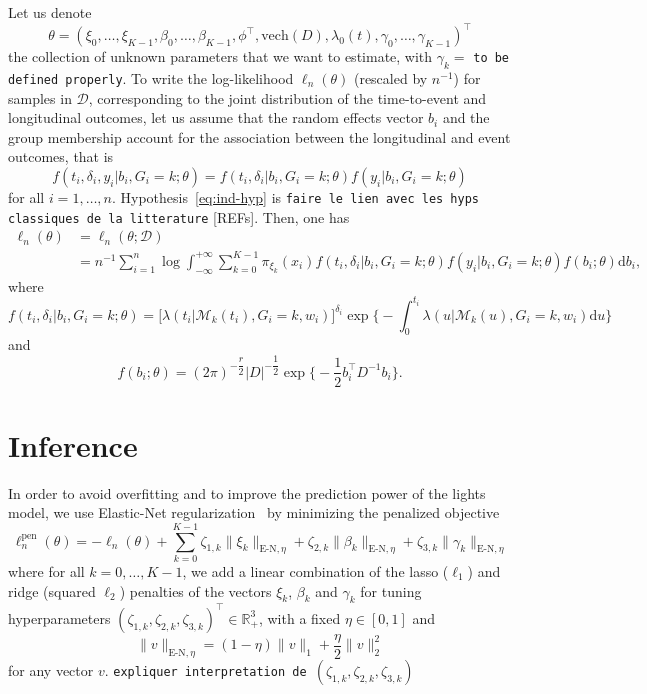 \documentclass[11pt]{article}
\newcommand{\dd}{\mathrm{d}}
\newcommand{\norm}[1]{\|#1\|}
\newcommand{\cM}{\mathcal M}
\newcommand{\cD}{\mathcal D}
\newcommand{\R}{\mathds R}
\begin{document}
Let us denote 
\[ \theta = (\xi_0, \ldots, \xi_{K-1}, \beta_0, \ldots, \beta_{K-1}, \phi^\top, \text{vech}(D), \lambda_0(t), \gamma_0, \ldots, \gamma_{K-1})^\top \]
the collection of unknown parameters that we want to estimate, with $\gamma_k=$ \texttt{to be defined properly}.
To write the log-likelihood $\ell_n(\theta)$ (rescaled by $n^{-1}$)  for samples in $\cD$, corresponding to the joint distribution of the time-to-event and longitudinal outcomes, let us assume that the random effects vector $b_i$ and the group membership account for the association between the longitudinal and event outcomes, that is
\begin{equation}
	\label{eq:ind-hyp}
	f(t_i, \delta_i, y_i | b_i, G_i = k ; \theta) = f(t_i, \delta_i| b_i, G_i = k ; \theta) f(y_i | b_i, G_i = k ; \theta)
\end{equation}
for all $i=1, \ldots, n$. Hypothesis~\eqref{eq:ind-hyp} is \texttt{faire le lien avec les hyps classiques de la litterature} [REFs].
Then, one has
\begin{align}
	\label{eq:log-lik}
	\ell_n(\theta) &= \ell_n(\theta ; \cD) \nonumber \\
	&= n^{-1} \sum_{i=1}^n \log \int_{-\infty}^{+\infty} \sum_{k=0}^{K-1} \pi_{\xi_k}(x_i) f(t_i, \delta_i| b_i, G_i = k ; \theta) f(y_i | b_i, G_i = k ; \theta) f(b_i ; \theta) \dd b_i,
\end{align}
where 
\[f(t_i, \delta_i| b_i, G_i = k ; \theta) = \big[\lambda(t_i|\cM_k(t_i), G_i = k, w_i)\big]^{\delta_i} \exp \Big\{-\int_0^{t_i} \lambda(u|\cM_k(u), G_i = k, w_i) \dd u \Big\} \]
and
\[f(b_i ; \theta) = (2 \pi)^{-\dfrac r2} |D|^{-\dfrac12} \exp \Big\{ -\dfrac12 b_i^\top D^{-1}b_i \Big\}.\]

\section{Inference}
\label{sec:inference}

In order to avoid overfitting and to improve the prediction power of the lights model, we use Elastic-Net regularization~\citep{zou2005regularization} by minimizing the penalized objective
\begin{equation}
	\ell_n^\text{pen}(\theta) = - \ell_n(\theta) + \sum_{k=0}^{K-1} \zeta_{1,k} \norm{\xi_k}_{\text{E-N}, \eta} + \zeta_{2,k} \norm{\beta_k}_{\text{E-N}, \eta} + \zeta_{3,k} \norm{\gamma_k}_{\text{E-N}, \eta}
\end{equation}
where for all $k=0, \ldots, K-1$, we add a linear combination of the lasso ($\ell_1$) and ridge (squared $\ell_2$) penalties of the vectors $\xi_k$, $\beta_k$ and $\gamma_k$ for tuning hyperparameters $(\zeta_{1,k}, \zeta_{2,k}, \zeta_{3,k})^\top \in \R_+^3$, with a fixed $\eta \in [0, 1]$ and 
\[ \norm{v}_{\text{E-N}, \eta} = (1-\eta)\norm{v}_1 + \dfrac\eta2 \norm{v}_2^2 \] 
for any vector $v$. \texttt{expliquer interpretation de $(\zeta_{1,k}, \zeta_{2,k}, \zeta_{3,k})$}
\end{document}
